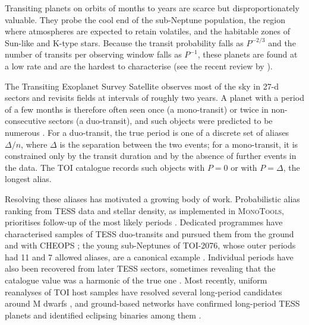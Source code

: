 \documentclass[fleqn,usenatbib]{mnras}
\begin{document}
Transiting planets on orbits of months to years are scarce but disproportionately valuable. They probe the cool end of the sub-Neptune population, the region where atmospheres are expected to retain volatiles, and the habitable zones of Sun-like and K-type stars. Because the transit probability falls as $P^{-2/3}$ and the number of transits per observing window falls as $P^{-1}$, these planets are found at a low rate and are the hardest to characterise (see the recent review by \citealt{UlmerMoll2026}).

The Transiting Exoplanet Survey Satellite \citep[TESS;][]{Ricker2015} observes most of the sky in 27-d sectors and revisits fields at intervals of roughly two years. A planet with a period of a few months is therefore often seen once (a mono-transit) or twice in non-consecutive sectors (a duo-transit), and such objects were predicted to be numerous \citep{Villanueva2019,Cooke2019,Cooke2021}. For a duo-transit, the true period is one of a discrete set of aliases $\Delta/n$, where $\Delta$ is the separation between the two events; for a mono-transit, it is constrained only by the transit duration and by the absence of further events in the data. The TOI catalogue \citep{Guerrero2021} records such objects with $P = 0$ or with $P = \Delta$, the longest alias.

Resolving these aliases has motivated a growing body of work. Probabilistic alias ranking from TESS data and stellar density, as implemented in \textsc{MonoTools}, prioritises follow-up of the most likely periods \citep{Osborn2022}. Dedicated programmes have characterised samples of TESS duo-transits and pursued them from the ground and with CHEOPS \citep{Hawthorn2024}; the young sub-Neptunes of TOI-2076, whose outer periods had 11 and 7 allowed aliases, are a canonical example \citep{Osborn2022}. Individual periods have also been recovered from later TESS sectors, sometimes revealing that the catalogue value was a harmonic of the true one \citep{Fukui2025}. Most recently, uniform reanalyses of TOI host samples have resolved several long-period candidates around M dwarfs \citep{Tschudi2026a,Tschudi2026b}, and ground-based networks have confirmed long-period TESS planets and identified eclipsing binaries among them \citep{Rea2026}.
\end{document}
